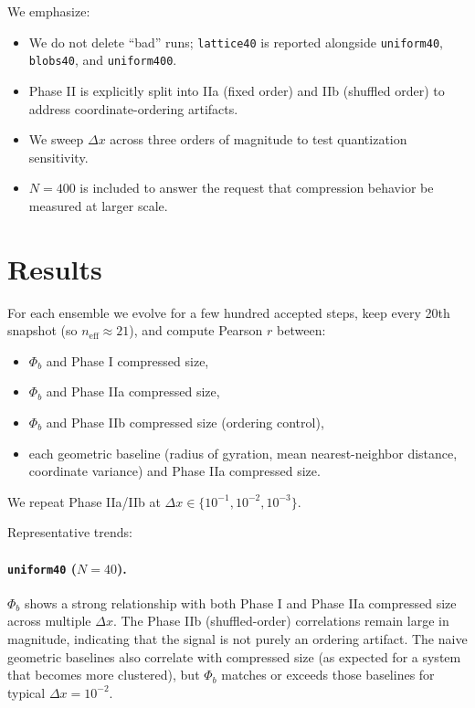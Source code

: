 \documentclass[11pt,a4paper]{article}
\numberwithin{equation}{section}
\newcommand{\phib}{\Phi_b}
\begin{document}
We emphasize:
\begin{itemize}
\item We do not delete ``bad'' runs; \texttt{lattice40} is reported alongside \texttt{uniform40}, \texttt{blobs40}, and \texttt{uniform400}.
\item Phase II is explicitly split into IIa (fixed order) and IIb (shuffled order) to address coordinate-ordering artifacts.
\item We sweep $\Delta x$ across three orders of magnitude to test quantization sensitivity.
\item $N{=}400$ is included to answer the request that compression behavior be measured at larger scale.
\end{itemize}

\section{Results}
\label{sec:results}

For each ensemble we evolve for a few hundred accepted steps, keep every 20th snapshot (so $n_{\text{eff}}\approx 21$), and compute Pearson $r$ between:
\begin{itemize}
\item $\phib$ and Phase I compressed size,
\item $\phib$ and Phase IIa compressed size,
\item $\phib$ and Phase IIb compressed size (ordering control),
\item each geometric baseline (radius of gyration, mean nearest-neighbor distance, coordinate variance) and Phase IIa compressed size.
\end{itemize}
We repeat Phase IIa/IIb at $\Delta x \in \{10^{-1},10^{-2},10^{-3}\}$.

Representative trends:

\paragraph{\texttt{uniform40} ($N{=}40$).}
$\phib$ shows a strong relationship with both Phase I and Phase IIa compressed size across multiple $\Delta x$. The Phase IIb (shuffled-order) correlations remain large in magnitude, indicating that the signal is not purely an ordering artifact. The naive geometric baselines also correlate with compressed size (as expected for a system that becomes more clustered), but $\phib$ matches or exceeds those baselines for typical $\Delta x=10^{-2}$.
\end{document}

